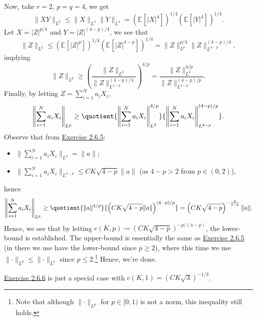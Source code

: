 \begin{answer}
	Now, take \(r = 2\), \(p = q = 4\), we get
	\[
		\lVert XY \rVert _{L^2}
		\leq \lVert X \rVert _{L^4} \lVert Y \rVert _{L^4}
		= \left( \mathbb{E}_{}[\vert X \vert ^4] \right) ^{1 / 4} \left( \mathbb{E}_{}[\vert Y \vert ^4] \right) ^{1 / 4}.
	\]
	Let \(X = \vert Z \vert ^{p / 4}\) and \(Y = \vert Z \vert ^{(4 - p) / 4}\), we see that
	\[
		\lVert Z \rVert _{L^2}
		\leq \left( \mathbb{E}_{}[\vert Z \vert ^p] \right) ^{1 / 4} \left( \mathbb{E}_{}[\vert Z \vert ^{4 - p}]  \right) ^{1 / 4}
		= \lVert Z \rVert _{L^p} ^{p / 4} \lVert Z \rVert _{L^{4 - p}}^{(4 - p) / 4},
	\]
	implying
	\[
		\lVert Z \rVert _{L^p}
		\geq \left( \frac{\lVert Z \rVert _{L^2}}{\lVert Z \rVert _{L^{4 - p}}^{(4 - p) / 4}} \right) ^{4 / p}
		= \frac{\lVert Z \rVert _{L^2}^{4 / p}}{\lVert Z \rVert _{L^{4 - p}}^{(4 - p) / p}}.
	\]
	Finally, by letting \(Z = \sum_{i=1}^{N} a_i X_i\),
	\[
		\left\lVert \sum_{i=1}^{N} a_i X_i \right\rVert _{L^p}
		\geq \quotient{\left\lVert \sum_{i=1}^{N} a_i X_i \right\rVert _{L^2}^{4 / p}}{\left\lVert \sum_{i=1}^{N} a_i X_i \right\rVert _{L^{4 - p}}^{(4 - p) / p}}.
	\]
	Observe that from \hyperref[ex2.6.5]{Exercise 2.6.5}:
	\begin{itemize}
		\item \(\lVert \sum_{i=1}^{N} a_i X_i \rVert _{L^2} = \lVert a \rVert \);
		\item \(\lVert \sum_{i=1}^{N} a_i X_i \rVert _{L^{4 - p}} \leq CK \sqrt{4 - p} \lVert a \rVert \) (as \(4 - p > 2\) from \(p \in (0, 2)\)),
	\end{itemize}
	hence
	\[
		\left\lVert \sum_{i=1}^{N} a_i X_i \right\rVert _{L^p}
		\geq \quotient{\lVert a \rVert ^{4 / p}}{\left( CK \sqrt{4 - p} \lVert a \rVert \right) ^{(4 - p) / p} }
		= \left( CK \sqrt{4 - p}  \right) ^{- \frac{p}{4-p}} \lVert a \rVert.
	\]
	Hence, we see that by letting \(c(K, p) \coloneqq (CK\sqrt{4 - p} )^{- p / (4 - p)}\), the lower-bound is established. The upper-bound is essentially the same as \hyperref[ex2.6.5]{Exercise 2.6.5} (in there we use have the lower-bound since \(p \geq 2\)), where this time we use \(\lVert \cdot \rVert _{L^p} \leq \lVert \cdot \rVert _{L^2}\) since \(p \leq 2\).\footnote{Note that although \(\lVert \cdot \rVert _{L^p}\) for \(p \in [0, 1)\) is not a norm, this inequality still holds.} Hence, we're done.
\end{answer}

\begin{remark}
	\hyperref[ex2.6.6]{Exercise 2.6.6} is just a special case with \(c(K, 1) = (CK \sqrt{3} )^{- 1 / 3}\).
\end{remark}

